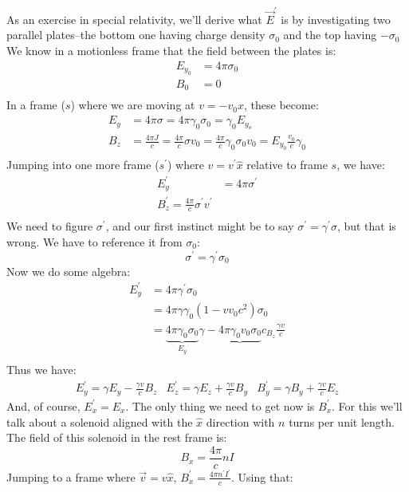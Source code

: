 \documentclass{article}
\def\ef{\vec E}
\def\ef{\vec E}
\def\^{\hat }
\begin{document}
As an exercise in special relativity, we'll derive what $\ef^\prime$ is by
\def\sigo{\sigma_0}
investigating two parallel plates--the bottom one having charge density $\sigo$ 
and the top having $-\sigo$ We
know in a motionless frame that the field between the plates is:
$$\begin{aligned}E_{y_0}&=4\pi\sigma_0\\ 
B_0&=0\\ \end{aligned}$$
In a frame ($s$) where we are moving at $v=-v_0\^x$, these become:
$$\begin{aligned}E_y&=4\pi\sigma=4\pi\gamma_0\sigo=\gamma_0E_{y_o}\\ 
B_z&=\frac{4\pi J}{ c}=\frac{4\pi}{ c}\sigma v_0=\frac{4\pi}{ c}\gamma_0\sigo v_0=
E_{y_0}\frac{v_0}{ c}\gamma_0\\ \end{aligned}$$
Jumping into one more frame ($s^\prime$) where $v=v^\prime\^x$ relative to 
frame $s$, we have:
$$\begin{aligned}E_y^\prime&=4\pi\sigma^\prime\\ 
B_z^\prime=\frac{4\pi}{ c}\sigma^\prime v^\prime\\ \end{aligned}$$
We need to figure $\sigma^\prime$, and our first instinct might be to say
$\sigma^\prime=\gamma^\prime\sigma$, but that is wrong.  We have to reference
it from $\sigo$:
$$\sigma^\prime=\gamma^\prime\sigo$$
Now we do some algebra:
\def\gamp{{\gamma^\prime}}
\def\gamo{{\gamma_0}}
$$\begin{aligned}E_y^\prime&=4\pi\gamp\sigo\\ 
&=4\pi\gamma\gamo(1-{vv_0}{ c^2})\sigo\\ 
&=\underbrace{4\pi\gamo\sigo}_{E_y}\gamma-\underbrace{4\pi\gamo v_0\sigo}{
c}_{B_z}\frac{\gamma v}{ c}\\ \end{aligned}$$
Thus we have:
$$\begin{matrix}
\boxed{E_y^\prime=\gamma E_y-\frac{\gamma v}{ c}B_z}&
\boxed{E_z^\prime=\gamma E_z+\frac{\gamma v}{ c}B_y}&
\boxed{B_y^\prime=\gamma B_y+\frac{\gamma v}{ c}E_z}
\end{matrix}$$
And, of course, $E_x^\prime=E_x$.  The only thing we need to get now is
$B_x^\prime$.  For this we'll talk about a solenoid aligned with the $\^x$
direction with $n$ turns per unit length.  The field of this solenoid
in the rest frame is:
$$B_x=\frac{4\pi}{ c}nI$$
Jumping to a frame where $\vec v=v\^x$, $B_x^\prime=\frac{4\pi n^\prime I^\prime}{
c}$. Using that:
\end{document}
